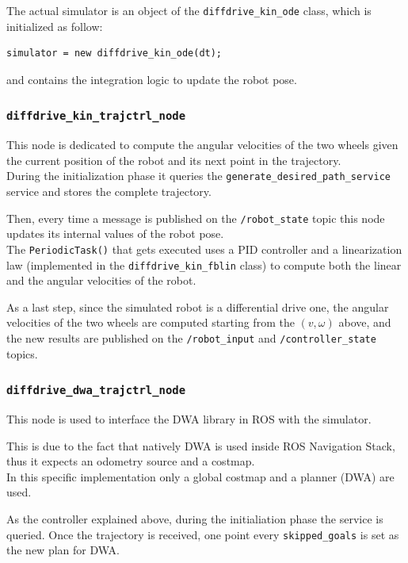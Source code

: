 \documentclass[11pt,a4paper]{article}
\begin{document}
The actual simulator is an object of the \texttt{diffdrive\_kin\_ode} class, which is initialized as follow:
\begin{lstlisting}
simulator = new diffdrive_kin_ode(dt);
\end{lstlisting}

and contains the integration logic to update the robot pose.

\subsubsection{\texttt{diffdrive\_kin\_trajctrl\_node}}

This node is dedicated to compute the angular velocities of the two wheels given the current position of the robot and its next point in the trajectory.\\

During the initialization phase it queries the \texttt{generate\_desired\_path\_service} service and stores the complete trajectory.

Then, every time a message is published on the \texttt{/robot\_state} topic this node updates its internal values of the robot pose.\\

The \texttt{PeriodicTask()} that gets executed uses a PID controller and a linearization law (implemented in the \texttt{diffdrive\_kin\_fblin} class) to compute both the linear and the angular velocities of the robot.

As a last step, since the simulated robot is a differential drive one, the angular velocities of the two wheels are computed starting from the $(v, \omega)$ above, and the new results are published on the \texttt{/robot\_input} and \texttt{/controller\_state} topics.

\subsubsection{\texttt{diffdrive\_dwa\_trajctrl\_node}}

This node is used to interface the DWA library in ROS with the simulator.

This is due to the fact that natively DWA is used inside ROS Navigation Stack, thus it expects an odometry source and a costmap.\\

In this specific implementation only a global costmap and a planner (DWA) are used.

As the controller explained above, during the initialiation phase the service is queried. Once the trajectory is received, one point every \texttt{skipped\_goals} is set as the new plan for DWA.
\end{document}
